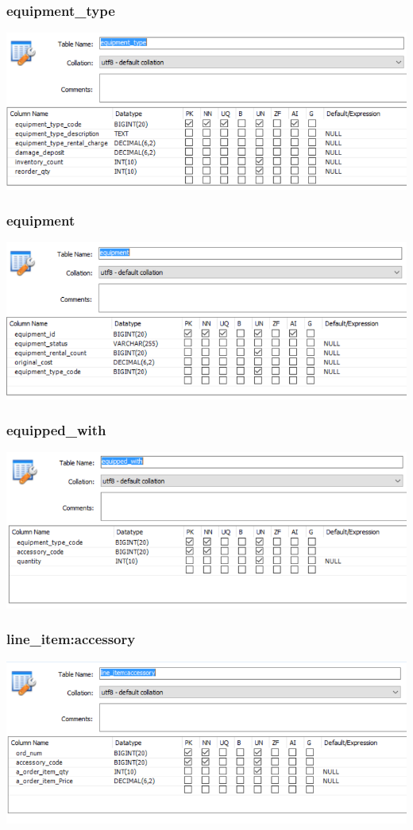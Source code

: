 \documentclass[12pt]{article}
\begin{document}
\subsubsection*{equipment\_type} \includegraphics[scale=0.55]{screenshots/structure/equipment_type.PNG} \\
\subsubsection*{equipment} \includegraphics[scale=0.55]{screenshots/structure/equipment.PNG} \\
\subsubsection*{equipped\_with} \includegraphics[scale=0.55]{screenshots/structure/equipped_with.PNG} \\
\subsubsection*{line\_item:accessory} \includegraphics[scale=0.55]{screenshots/structure/line_item_accessory.PNG} \\
\end{document}
